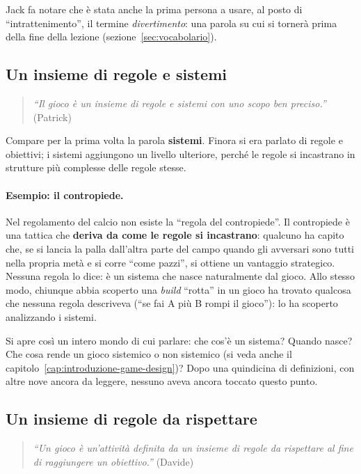 Jack fa notare che è stata anche la prima persona a usare, al posto di
``intrattenimento'', il termine \emph{divertimento}: una parola su cui si
tornerà prima della fine della lezione (sezione~\ref{sec:vocabolario}).

\subsection{Un insieme di regole e sistemi}

\begin{quote}
\emph{``Il gioco è un insieme di regole e sistemi con uno scopo ben
preciso.''} (Patrick)
\end{quote}

Compare per la prima volta la parola \textbf{sistemi}. Finora si era parlato
di regole e obiettivi; i sistemi aggiungono un livello ulteriore, perché le
regole si incastrano in strutture più complesse delle regole stesse.

\paragraph{Esempio: il contropiede.} Nel regolamento del calcio non esiste la
``regola del contropiede''. Il contropiede è una tattica che \textbf{deriva da
come le regole si incastrano}: qualcuno ha capito che, se si lancia la palla
dall'altra parte del campo quando gli avversari sono tutti nella propria metà
e si corre ``come pazzi'', si ottiene un vantaggio strategico. Nessuna regola
lo dice: è un sistema che nasce naturalmente dal gioco. Allo stesso modo,
chiunque abbia scoperto una \emph{build} ``rotta'' in un gioco ha trovato
qualcosa che nessuna regola descriveva (``se fai A più B rompi il gioco''):
lo ha scoperto analizzando i sistemi.

Si apre così un intero mondo di cui parlare: che cos'è un sistema? Quando
nasce? Che cosa rende un gioco sistemico o non sistemico (si veda anche il
capitolo~\ref{cap:introduzione-game-design})? Dopo una quindicina di
definizioni, con altre nove ancora da leggere, nessuno aveva ancora toccato
questo punto.

\subsection{Un insieme di regole da rispettare}

\begin{quote}
\emph{``Un gioco è un'attività definita da un insieme di regole da rispettare al
fine di raggiungere un obiettivo.''} (Davide)
\end{quote}

